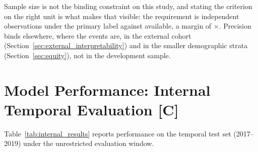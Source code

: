 Sample size is not the binding constraint on this study, and stating the
criterion on the right unit is what makes that visible: the requirement is
\pcMinNRileyStayB{} independent observations under the primary label against
\pcNTrainStays{} available, a margin of \pcRileyMarginB$\times$. Precision binds
elsewhere, where the events are, in the external cohort
(Section~\ref{sec:external_interpretability}) and in the smaller demographic
strata (Section~\ref{sec:equity}), not in the development sample.



\section{Model Performance: Internal Temporal Evaluation \texorpdfstring{[C]}{[C]}}
\label{sec:internal_performance}

Table~\ref{tab:internal_results} reports performance on the temporal test set
(2017--2019) under the unrestricted evaluation window.

